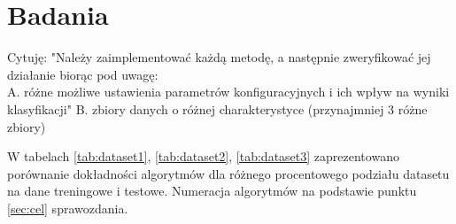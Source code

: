 \documentclass[a4paper,11pt]{article}
\begin{document}
\section{Badania}

\color{red}
Cytuję: "Należy zaimplementować każdą metodę, a następnie zweryfikować jej działanie biorąc pod uwagę:\\
A. różne możliwe ustawienia parametrów konfiguracyjnych i ich wpływ na wyniki klasyfikacji"
B. zbiory danych o różnej charakterystyce (przynajmniej 3 różne zbiory)
\color{black}

W tabelach \ref{tab:dataset1}, \ref{tab:dataset2}, \ref{tab:dataset3} zaprezentowano porównanie dokładności algorytmów dla różnego procentowego podziału datasetu na dane treningowe i testowe. Numeracja algorytmów na podstawie punktu \ref{sec:cel} sprawozdania.
\end{document}
